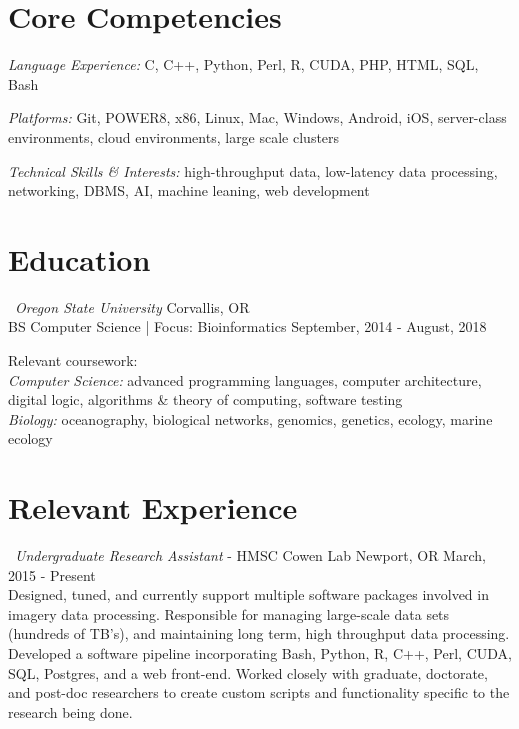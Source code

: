 \documentclass{res}
\begin{document}
 
\begin{resume}


\section{\bf\Large  Core Competencies} 
{\sl Language Experience:} C, C++, Python, Perl, R, CUDA, PHP, HTML, SQL, Bash  \hfill

{\sl  Platforms:} Git, POWER8, x86, Linux, Mac, Windows, Android, iOS, server-class environments, cloud environments, large scale clusters

{\sl Technical Skills \& Interests:} high-throughput data, low-latency data processing, networking, DBMS, AI, machine leaning, web development
\mbox{ }

\section{\bf\Large Education} 
\textbullet \ {\sl \large Oregon State University}  \hfill  Corvallis, OR     \\
BS Computer Science | Focus: Bioinformatics  \hfill  September, 2014 - August, 2018

Relevant coursework: \\
{\sl Computer Science:} advanced programming languages, computer architecture, digital logic, algorithms \& theory of computing, software testing \\
{\sl Biology:} oceanography, biological networks, genomics, genetics, ecology, marine ecology
\mbox{ }

\section{\bf\Large Relevant Experience} 
\textbullet \ {\sl Undergraduate Research Assistant} - HMSC Cowen Lab \hfill Newport, OR March, 2015 - Present \\
Designed, tuned, and currently support multiple software packages involved in imagery data processing. Responsible for managing large-scale data sets (hundreds of TB's), and maintaining long term, high throughput data processing. Developed a software pipeline incorporating Bash, Python, R, C++, Perl, CUDA, SQL, Postgres, and a web front-end. Worked closely with graduate, doctorate, and post-doc researchers to create custom scripts and functionality specific to the research being done.


\end{resume}
\end{document}
